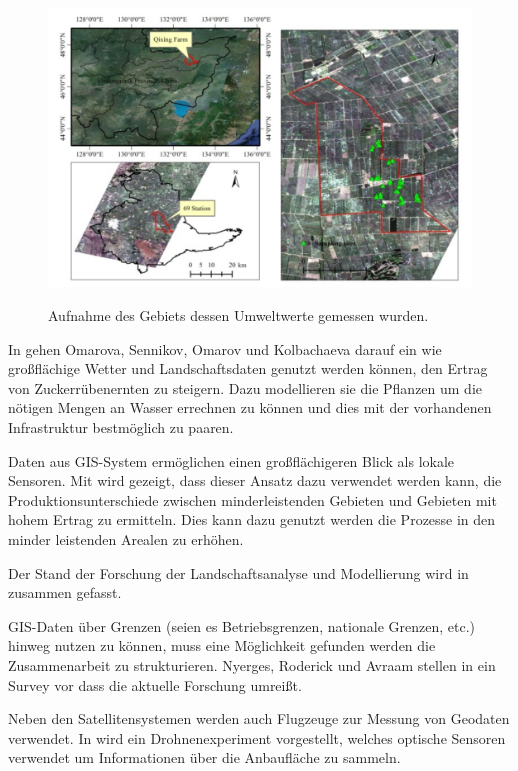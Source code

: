 \begin{figure}[h]
 \includegraphics[scale=0.4,natwidth=\textwidth]{figures/sensors/satellite_area.png}
 \centering
 \label{fig:satellite_area}
 \caption{Aufnahme des Gebiets dessen Umweltwerte gemessen wurden. \cite{jour:Huang2013}}
\end{figure}

In \cite{jour:Omarova2013} gehen Omarova, Sennikov, Omarov und Kolbachaeva darauf ein wie großflächige Wetter und Landschaftsdaten genutzt werden können, den Ertrag von Zuckerrübenernten zu steigern. Dazu modellieren sie die Pflanzen um die nötigen Mengen an Wasser errechnen zu können und dies mit der vorhandenen Infrastruktur bestmöglich zu paaren.

Daten aus GIS-System ermöglichen einen großflächigeren Blick als lokale Sensoren. Mit \cite{book:Hou2013} wird gezeigt, dass dieser Ansatz dazu verwendet werden kann, die Produktionsunterschiede zwischen minderleistenden Gebieten und Gebieten mit hohem Ertrag zu ermitteln. Dies kann dazu genutzt werden die Prozesse in den minder leistenden Arealen zu erhöhen.

Der Stand der Forschung der Landschaftsanalyse und Modellierung wird in \cite{jour:Zhou2013} zusammen gefasst.

GIS-Daten über Grenzen (seien es Betriebsgrenzen, nationale Grenzen, etc.) hinweg nutzen zu können, muss eine Möglichkeit gefunden werden die Zusammenarbeit zu strukturieren. Nyerges, Roderick und Avraam stellen in \cite{jour:Nyerges2013} ein Survey vor dass die aktuelle Forschung umreißt. 

Neben den Satellitensystemen werden auch Flugzeuge zur Messung von Geodaten verwendet. In \cite{jour:Honkavaara2012} wird ein Drohnenexperiment vorgestellt, welches optische Sensoren verwendet um Informationen über die Anbaufläche zu sammeln.